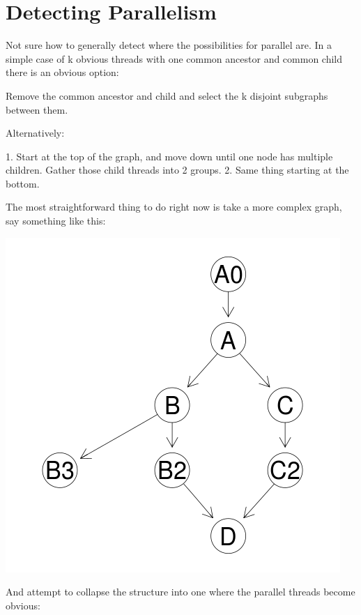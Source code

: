\documentclass[12pt]{article}
\begin{document}
\section{Detecting Parallelism}

Not sure how to generally detect where the possibilities for
parallel are. In a simple case of k obvious threads with one common
ancestor and common child there is an obvious option:

Remove the common ancestor and child and select the k disjoint subgraphs
between them.

Alternatively:

1. Start at the top of the graph, and move down until one node has
multiple children. Gather those child threads into 2 groups.
2. Same thing starting at the bottom.

The most straightforward thing to do right now is take a more complex
graph, say something like this:

\centerline{\includegraphics{../codedepends/larger_graph.png}}


And attempt to collapse the structure into one where the parallel threads
become obvious:
\end{document}
